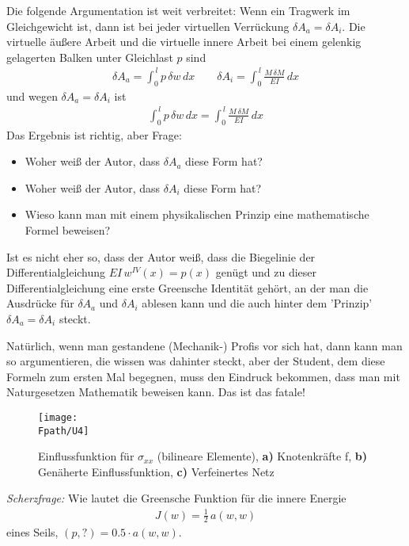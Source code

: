 {{{{Die folgende Argumentation ist weit verbreitet: Wenn ein Tragwerk im Gleichgewicht ist, dann ist bei jeder virtuellen Verr\"{u}ckung $\delta A_a = \delta A_i$. Die virtuelle \"{a}u{\ss}ere Arbeit und die virtuelle innere Arbeit bei einem gelenkig gelagerten Balken unter Gleichlast $p$ sind
\begin{align}
\delta A_a = \int_0^{\,l} p\,\delta w\,dx \qquad \delta A_i = \int_0^{\,l} \frac{M\,\delta M}{EI}\,dx
\end{align}
und wegen $\delta A_a = \delta A_i$ ist
\begin{align}
\int_0^{\,l} p\,\delta w\,dx = \int_0^{\,l} \frac{M\,\delta M}{EI}\,dx
\end{align}
Das Ergebnis ist richtig, aber Frage:
\begin{itemize}
  \item Woher wei{\ss} der Autor, dass $\delta A_a$ diese Form hat?
  \item Woher wei{\ss} der Autor, dass $\delta A_i$ diese Form hat?
  \item Wieso kann man mit einem physikalischen Prinzip eine mathematische Formel beweisen?
\end{itemize}
Ist es nicht eher so, dass der Autor wei{\ss}, dass die Biegelinie der Differentialgleichung $EI\,w^{IV}(x) = p(x)$ gen\"{u}gt und zu dieser Differentialgleichung eine erste Greensche Identit\"{a}t geh\"{o}rt, an der man die Ausdr\"{u}cke f\"{u}r $\delta A_a$ und $\delta A_i$ ablesen kann und die auch hinter dem 'Prinzip' $\delta A_a = \delta A_i$ steckt.

Nat\"{u}rlich, wenn man gestandene (Mechanik-) Profis vor sich hat, dann kann man so argumentieren, die wissen was dahinter steckt, aber der Student, dem diese Formeln zum ersten Mal begegnen, muss den Eindruck bekommen, dass man mit Naturgesetzen Mathematik beweisen kann. Das ist das fatale!

\begin{figure}[tbp]
\centering
\if {} \sidecaption \fi
\texttt{[image: \\Fpath/U4]}
\caption{Einflussfunktion f\"{u}r $\sigma_{xx}$ (bilineare Elemente),  \textbf{ a)} Knotenkr\"{a}fte \vek f,  \textbf{ b)} Gen\"{a}herte Einflussfunktion,  \textbf{ c)} Verfeinertes Netz} \label{U4}
\end{figure}%

{\em Scherzfrage:\/} Wie lautet die Greensche Funktion f\"{u}r die innere Energie
\begin{align} \label{Eq86}
J(w) = \frac{1}{2}\,a(w,w)
\end{align}
eines Seils, $(p, ?) = 0.5 \cdot a(w,w)$.

}}}}
